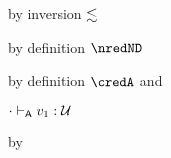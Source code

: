 {\begin{lamportproof*}
    \begin{pfproof}
        \begin{pfproof}
          by inversion $\lesssim$
        \end{pfproof}
        \begin{pfproof}
          by definition $\nredND$
        \end{pfproof}
        \begin{pfproof}
          by definition $\credA$ and 
        \end{pfproof}
      \qedstep
    \end{pfproof}

    \begin{pfproof}
      \absurdstep
        \begin{pfproof}
          ${\cdot} \vdash_{\mathsf{A}} v_1 : {\mathcal U}$
        \end{pfproof}
    \end{pfproof}

    \begin{pfproof}
      \absurdstep
        \begin{pfproof}
          by 
        \end{pfproof}
    \end{pfproof}


\end{lamportproof*}}
